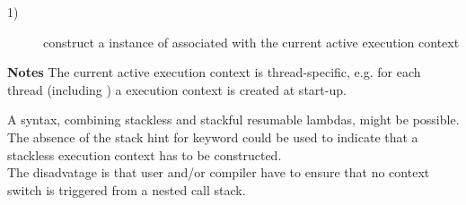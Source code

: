 \begin{description}
    \item[1)] construct a instance of \ectx associated with the current active
              execution context\\
\end{description}

{\bf Notes}
\newline
The current active execution context is thread-specific, e.g. for each thread
(including \main) a execution context is created at start-up.

A syntax, combining stackless and stackful resumable lambdas, might be possible.
The absence of the stack hint for keyword \resumable could be used to indicate
that a stackless execution context has to be constructed.\\
The disadvatage is that user and/or compiler have to ensure that no context
switch is triggered from a nested call stack.
